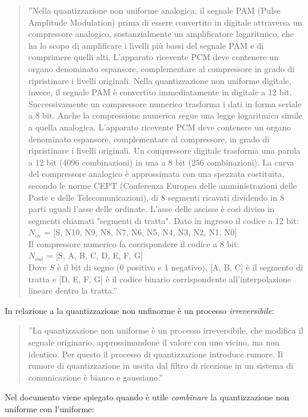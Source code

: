 \documentclass[a4paper]{report} %
\begin{document}
\begin{quote}	
	''Nella quantizzazione non uniforme analogica, il segnale PAM (Pulse Amplitude Modulation) prima di essere convertito in digitale attraversa un compressore analogico, sostanzialmente un amplificatore logaritmico, che ha lo scopo di amplificare i livelli più bassi del segnale PAM e di comprimere quelli alti. L'apparato ricevente PCM deve contenere un organo denominato espansore, complementare al compressore in grado di ripristinare i livelli originali. Nella quantizzazione non uniforme digitale, invece, il segnale PAM è convertito immediatamente in digitale a 12 bit. Successivamente un compressore numerico trasforma i dati in forma seriale a 8 bit. Anche la compressione numerica segue una legge logaritmica simile a quella analogica. L'apparato ricevente PCM deve contenere un organo denominato espansore, complementare al compressore, in grado di ripristinare i livelli originali. Un compressore digitale trasforma una parola a 12 bit (4096 combinazioni) in una a 8 bit (256 combinazioni). La curva del compressore analogico è approssimata con una spezzata costituita, secondo le norme CEPT (Conferenza Europea delle amministrazioni delle Poste e delle Telecomunicazioni), di 8 segmenti ricavati dividendo in 8 parti uguali l'asse delle ordinate. L'asse delle ascisse è così diviso in segmenti chiamati "segmenti di tratta". Dato in ingresso il codice a 12 bit: \\
	$N_{in}$ = [S, N10, N9, N8, N7, N6, N5, N4, N3, N2, N1, N0] \\
	Il compressore numerico fa corrispondere il codice a 8 bit: \\
	$N_{out}$ = [S, A, B, C, D, E, F, G] \\
	Dove $S$ è il bit di segno (0 positivo e 1 negativo), [A, B, C] è il segmento di tratta e [D, E, F, G] è il codice binario corrispondente all'interpolazione lineare dentro la tratta.'' 
\end{quote}
In relazione a \cite{art:rif.6} la quantizzazione non unfinorme è un processo \textit{irreversibile}:
\begin{quote}
	''La quantizzazione non uniforme è un processo irreversibile, che modifica il segnale originario, approssimandone il valore con uno vicino, ma non identico. Per questo il processo di quantizzazione introduce rumore. Il rumore di quantizzazione in uscita dal filtro di ricezione in un sistema di comunicazione è bianco e gaussiano.'' 
\end{quote}
Nel documento \cite{art:rif.7} viene spiegato quando è utile \textit{combinare} la quantizzazione non uniforme con l'uniforme:
\end{document}
